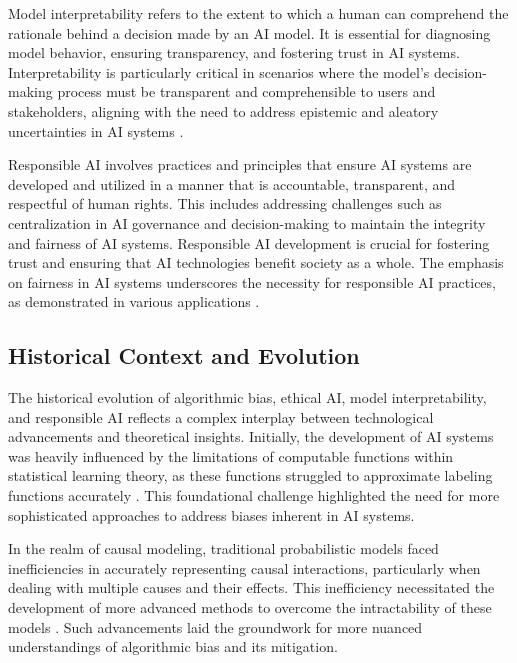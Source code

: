 Model interpretability refers to the extent to which a human can comprehend the rationale behind a decision made by an AI model. It is essential for diagnosing model behavior, ensuring transparency, and fostering trust in AI systems. Interpretability is particularly critical in scenarios where the model's decision-making process must be transparent and comprehensible to users and stakeholders, aligning with the need to address epistemic and aleatory uncertainties in AI systems \cite{gan2019correlatedutilitybasedpatternmining}.



Responsible AI involves practices and principles that ensure AI systems are developed and utilized in a manner that is accountable, transparent, and respectful of human rights. This includes addressing challenges such as centralization in AI governance and decision-making to maintain the integrity and fairness of AI systems. Responsible AI development is crucial for fostering trust and ensuring that AI technologies benefit society as a whole. The emphasis on fairness in AI systems underscores the necessity for responsible AI practices, as demonstrated in various applications \cite{gan2019correlatedutilitybasedpatternmining}.



\subsection{Historical Context and Evolution} \label{subsec:Historical Context and Evolution}

The historical evolution of algorithmic bias, ethical AI, model interpretability, and responsible AI reflects a complex interplay between technological advancements and theoretical insights. Initially, the development of AI systems was heavily influenced by the limitations of computable functions within statistical learning theory, as these functions struggled to approximate labeling functions accurately \cite{ryabko2005samplecomplexitycomputationalpattern}. This foundational challenge highlighted the need for more sophisticated approaches to address biases inherent in AI systems.



In the realm of causal modeling, traditional probabilistic models faced inefficiencies in accurately representing causal interactions, particularly when dealing with multiple causes and their effects. This inefficiency necessitated the development of more advanced methods to overcome the intractability of these models \cite{meek2015structureparameterlearningcausal}. Such advancements laid the groundwork for more nuanced understandings of algorithmic bias and its mitigation.



